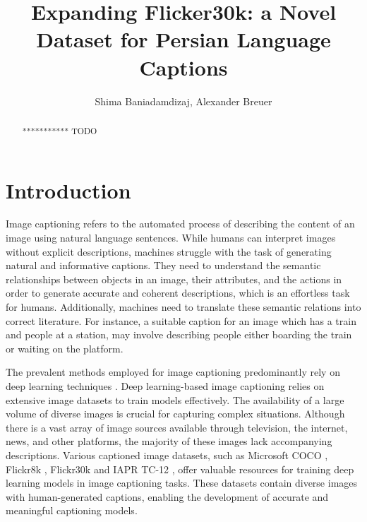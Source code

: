 \documentclass[runningheads]{llncs}
\begin{document}
%
\title{Expanding Flicker30k: a Novel Dataset for Persian Language Captions}
%
%
\author{Shima Baniadamdizaj,
Alexander Breuer}
%
%
%
\maketitle              %
%
\begin{abstract}
*********** TODO

\end{abstract}
%
%
%
\section{Introduction}
Image captioning refers to the automated process of describing the content of an image using natural language sentences. While humans can interpret images without explicit descriptions, machines struggle with the task of generating natural and informative captions. They need to understand the semantic relationships between objects in an image, their attributes, and the actions in order to generate accurate and coherent descriptions, which is an effortless task for humans. Additionally, machines need to translate these semantic relations into correct literature. For instance, a suitable caption for an image which has a train and people at a station, may involve describing people either boarding the train or waiting on the platform.

The prevalent methods employed for image captioning predominantly rely on deep learning techniques \cite{Karpathy2015,Vinyals2015,Xu2015,Luo2023}. Deep learning-based image captioning relies on extensive image datasets to train models effectively. The availability of a large volume of diverse images is crucial for capturing complex situations. Although there is a vast array of image sources available through television, the internet, news, and other platforms, the majority of these images lack accompanying descriptions. Various captioned image datasets, such as Microsoft COCO \cite{MSCOCO}, Flickr8k \cite{Flickr8k}, Flickr30k \cite{Flickr30k} and IAPR TC-12 \cite{IAPRTC12}, offer valuable resources for training deep learning models in image captioning tasks. These datasets contain diverse images with human-generated captions, enabling the development of accurate and meaningful captioning models.
\end{document}
